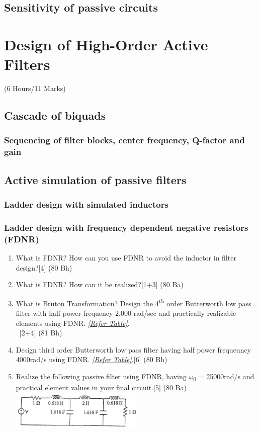 \documentclass[12pt]{article}
\newcommand{\w}{\(\omega\)}
\newcommand{\enter}{\\\textcolor{white}{1}}
\newcommand{\sub}[1]{\textsubscript{#1}}
\begin{document}
\subsection{Sensitivity of passive circuits}

\pagebreak
\section{Design of High-Order Active Filters}
\begin{center}(6 Hours/11 Marks)\end{center}
\subsection{Cascade of biquads}
\subsubsection{Sequencing of filter blocks, center frequency, Q-factor and gain}
\subsection{Active simulation of passive filters}
\subsubsection{Ladder design with simulated inductors}
\subsubsection{Ladder design with frequency dependent negative resistors (FDNR)}
\begin{enumerate}
\item What is FDNR? How can you use FDNR to avoid the inductor in filter design?\hfill[4] (80 Bh)
\item What is FDNR? How can it be realized?\hfill [1+3] (80 Ba)
\item What is Bruton Transformation? Design the 4\textsuperscript{th} order Butterworth low pass filter with half power frequency 2,000 rad/sec and practically realizable elements using FDNR. \textit{[\hyperref[sec:tables_81bh]{Refer Table]}}.
\enter\hfill [2+4] (81 Bh)
\item Design third order Butterworth low pass filter having half power frequeuncy 4000rad/s using FDNR. \textit{[\hyperref[sec:tables_81bh]{Refer Table]}}.\hfill [6] (80 Bh)
\item Realize the following passive filter using FDNR, having \w\sub{0} = 25000rad/s and practical element values in your final circuit.\hfill[5] (80 Ba)
\includegraphics[width=0.5\textwidth]{fd_4}
\end{enumerate}
\end{document}
